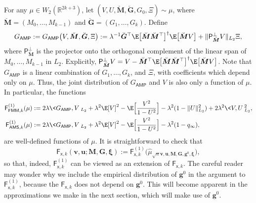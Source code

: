 \documentclass[]{article}
\def\sx{{\mathsf x}}
\def\bv{{\boldsymbol V}}
\def\bM{{\boldsymbol M}}
\def\proj{{\mathsf P}}
\def\bu{{\boldsymbol u}}
\def\bg{{\boldsymbol g}}
\def\bv{{\boldsymbol v}}
\def\bxi{{\boldsymbol \xi}}
\def\reals{{\mathbb R}}
\def\bG{{\boldsymbol G}}
\def\bv{{\boldsymbol v}}
\def\proj{{\mathsf P}}
\def\bu{{\boldsymbol u}}
\def\bg{{\boldsymbol g}}
\def\muhat{\widehat{\mu}{}}
\def\AMP{\mathsf{AMP}}
\def\sF{\mathsf{F}}
\def\brevebM{\breve{\boldsymbol{M}}{}}
\def\brevebG{\breve{\boldsymbol{G}}{}}
\def\FMM{\mathsf{FMM}}
\def\AMS{\mathsf{AMS}}
\begin{document}
For any $\mu \in W_2(\reals^{2k+3})$,
let $(V,U,\brevebM,\brevebG,G_0,\Xi) \sim \mu$,
where $\brevebM = (M_0,\ldots,M_{k-1})$ and $\brevebG = (G_1,\ldots,G_k)$.
Define 
\begin{equation}
\label{eq:G-AMP}
    G_{\AMP} 
        := G_{\AMP}\big( V , \brevebM , \brevebG , \Xi \big) 
        := \lambda^{-1}\brevebG^\top \E\big[\brevebM\brevebM^\top\big]^\dagger \E\big[ \brevebM V \big] 
            +
            \| \proj_{\brevebM}^\perp V \|_{L_2} \Xi, 
\end{equation}
where $\proj_{\brevebM}^\perp$  is the projector onto the orthogonal complement of the linear span of $M_0,\ldots,M_{k-1}$ in $L_2$.
Explicitly, $\proj_{\brevebM}^\perp V = V - \brevebM^\top \E\big[\brevebM\brevebM^\top\big]^\dagger \E\big[ \brevebM V \big] $.
Note that $G_{\AMP}$ is a linear combination of $G_1,\ldots,G_k$, and $\Xi$, 
with coefficients which depend only on $\mu$. 
Thus, the joint distribution of $G_{\AMP}$ and $V$ is also only a function of $\mu$. 
In particular, 
the functions
\begin{equation}
\label{eq:Leps-dist}
\begin{aligned}
    \sF^{(1)}_{\FMM,k}(\mu)
        &:=
        2\lambda \< G_{\AMP} , V \>_{L_2}
            + 
            \lambda^2 \E[V]^2 
            - 
            \E\Big[\frac{V^2}{1-U^2}\Big]
            -
            \lambda^2(1 - \| U \|_{L_2}^2)
            + 
            2\lambda^2 \< V , U \>_{L_2}^2,
    \\
    \sF^{(1)}_{\AMS,k}(\mu)
        &:=
        2\lambda \< G_{\AMP} , V \>_{L_2}
            + 
            \lambda^2 \E[V]^2 
            - 
            \E\Big[\frac{V^2}{1-U^2}\Big]
            -
            \lambda^2(1 - q_\infty),
\end{aligned}
\end{equation}
are well-defined functions of $\mu$.
It is straightforward to check that
\begin{equation}
    \sF_{\sx,k}(\bv,\bu;\bM,\bG,\bxi)
        :=
        \sF^{(1)}_{\sx,k}\big(\muhat_{\sqrt{n}\bv,\bu,\bM,\bG,\bg^0,\bxi}\big),
\end{equation}
so that, indeed, $\sF^{(1)}_{\sx,k}$ can be viewed as an extension of $\sF_{\sx,k}$.
The careful reader may wonder why we include the empirical distribution of $\bg^0$ in the argument to $\sF_{\sx,k}^{(1)}$,
because the $\sF_{\sx,k}$ does not depend on $\bg^0$.
This will become apparent in the approximations we make in the next section,
which will make use of $\bg^0$.
\end{document}
